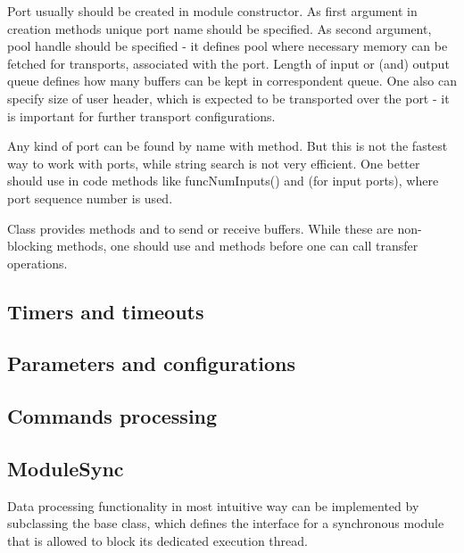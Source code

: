 Port usually should be created in module constructor.
As first argument in creation methods unique port name should be specified.
As second argument, pool handle should be
specified - it defines pool where necessary memory can be fetched for transports, 
associated with the port. Length of input or (and) output queue defines how many
buffers can be kept in correspondent queue. One also can specify size of user header,
which is expected to be transported over the port - it is important for further transport configurations.    

Any kind of port can be found by name with  method.
But this is not the fastest way to work with ports, while string search is not
very efficient. 
One better should use in code methods like func{NumInputs()} and  (for input ports),
where port sequence number is used. 

Class  provides methods  and  to send or receive buffers. 
While these are non-blocking methods, one should use  and  methods 
before one can call transfer operations.


\subsection{Timers and timeouts}




\subsection{Parameters and configurations}

\subsection{Commands processing}


\subsection{ModuleSync}
\label{plugin_module_sync}
Data processing functionality in most intuitive way can be implemented by subclassing 
the  base class, which defines the interface for a 
synchronous module that is allowed to block its dedicated execution thread.  
   
